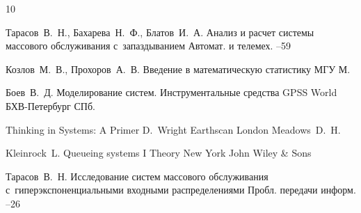 \begin{thebibliography}{10}


\by Тарасов~В.~Н., Бахарева~Н.~Ф., Блатов~И.~А.
\paper Анализ и расчет системы массового обслуживания с~запаздыванием
\jour Автомат. и телемех.
--59


\by Козлов~М.~В., Прохоров~А.~В.
\book Введение в математическую статистику
\publ МГУ
\publaddr М.



\by Боев~В.~Д.
\book Моделирование систем. Инструментальные средства GPSS World
\publ БХВ-Петербург
\publaddr СПб.



\book Thinking in Systems: A Primer
\ed D.~Wright
\publ Earthscan
\publaddr London
\by Meadows~D.~H.




\by Kleinrock~L.
\book  Queueing systems
\bookvol I
\volinfo Theory
\publaddr New York 
\publ John Wiley \& Sons


\by Тарасов~В.~Н.
\paper Исследование систем массового обслуживания с~гиперэкспоненциальными входными распределениями
\jour Пробл. передачи информ.
--26




\end{thebibliography}
